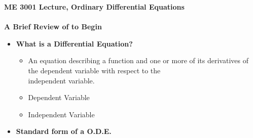 \documentclass[11pt]{article}
\begin{document}
\textbf{ \LARGE ME 3001 Lecture, Ordinary Differential Equations} \\\\
\textbf{ \LARGE A Brief Review of to Begin} \\

\begin{itemize}

	\item  \textbf{\LARGE What is a Differential Equation?}
		\LARGE
		\begin{itemize}
			\item An equation describing a function and one or more of its derivatives of the \color{mypurple}dependent variable \color{black} with respect to the \\ \color{blue} independent variable\color{black}. \\ \vspace{10mm}
			
			\item \color{mypurple}Dependent Variable \color{black}	\\\vspace{20mm}
			
			\item \color{blue} Independent Variable\color{black} \\\vspace{20mm}
		\end{itemize}	

	\item \textbf{\LARGE Standard form of a O.D.E.} \vspace{10mm}\\
				\vspace{10mm}\\		


\end{itemize}
\end{document}

